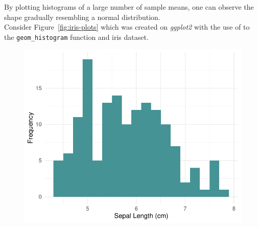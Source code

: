 \documentclass{article}\usepackage[]{graphicx}\usepackage[]{xcolor}
\newenvironment{knitrout}{}{} %
\numberwithin{equation}{section}
\begin{document}
\noindent By plotting histograms of a large number of sample means, one can observe the shape gradually resembling a normal distribution.\\

\noindent
Consider Figure~\ref{fig:iris-plots} which was created on \textit{ggplot2} with the use of to the \texttt{geom\_histogram} function and iris dataset.

\begin{figure}[htbp]
  \centering
  \begin{minipage}[b]{0.48\linewidth}
\begin{knitrout}\scriptsize
{}\color{fgcolor}

{\centering \includegraphics[width=\linewidth]{figure/beamer-hist2-1} 

}


\end{knitrout}
  \end{minipage}
  \hfill
  \begin{minipage}[b]{0.48\linewidth}
\begin{knitrout}\scriptsize
{}\color{fgcolor}


\end{knitrout}
\end{minipage}
\end{figure}
\end{document}

